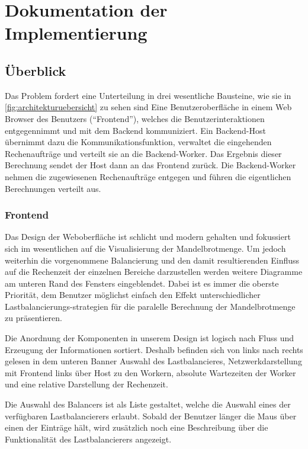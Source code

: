 \section{Dokumentation der Implementierung}


\subsection{Überblick}

Das Problem fordert eine Unterteilung in drei wesentliche Bausteine, wie sie in \autoref{fig:architekturuebersicht} zu sehen sind
Eine Benutzeroberfläche in einem Web Browser des Benutzers (“Frontend”), welches die Benutzerinteraktionen entgegennimmt und mit dem Backend kommuniziert.
Ein Backend-Host übernimmt dazu die Kommunikationsfunktion, verwaltet die eingehenden Rechenaufträge und verteilt sie an die Backend-Worker. Das Ergebnis dieser Berechnung sendet der Host dann an das Frontend zurück.
Die Backend-Worker nehmen die zugewiesenen Rechenaufträge entgegen und führen die eigentlichen Berechnungen verteilt aus.

\subsubsection{Frontend}

Das Design der Weboberfläche ist schlicht und modern gehalten und fokussiert sich im wesentlichen auf die Visualisierung der Mandelbrotmenge. Um jedoch weiterhin die vorgenommene Balancierung und den damit resultierenden Einfluss auf die Rechenzeit der einzelnen Bereiche darzustellen werden weitere Diagramme am unteren Rand des Fensters eingeblendet. Dabei ist es immer die oberste Priorität, dem Benutzer möglichst einfach den Effekt unterschiedlicher Lastbalancierungs-strategien für die paralelle Berechnung der Mandelbrotmenge zu präsentieren.

Die Anordnung der Komponenten in unserem Design ist logisch nach Fluss und Erzeugung der Informationen sortiert. Deshalb befinden sich von links nach rechts gelesen in dem unteren Banner Auswahl des Lastbalancieres, Netzwerkdarstellung mit Frontend links über Host zu den Workern, absolute Wartezeiten der Worker und eine relative Darstellung der Rechenzeit.

Die Auswahl des Balancers ist als Liste gestaltet, welche die Auswahl eines der verfügbaren Lastbalancierers erlaubt. Sobald der Benutzer länger die Maus über einen der Einträge hält, wird zusätzlich noch eine Beschreibung über die Funktionalität des Lastbalancierers angezeigt.

